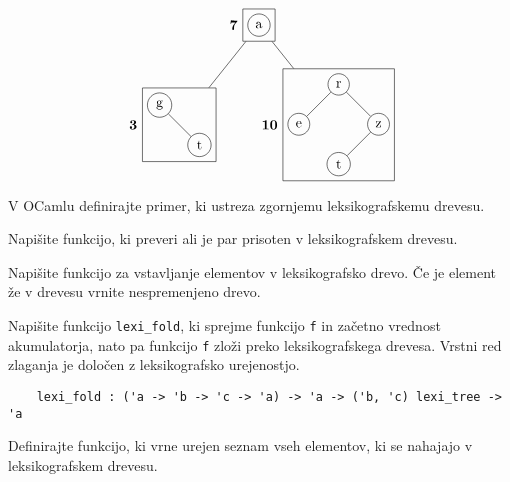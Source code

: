 \documentclass[arhiv]{../izpit}
\begin{document}
\[
  \begin{tikzpicture}[level distance=2.5cm,
    level 1/.style={sibling distance=4cm},
    level 2/.style={sibling distance=2cm}
    ]
    \node[rectangle, draw, label=left:\textbf{7}] 
        {\begin{tikzpicture}[level distance=1cm]
            \node [circle,draw] {a};
        \end{tikzpicture}}
    child {node [rectangle, draw, label=left:\textbf{3}] 
        {\begin{tikzpicture}[level distance=1cm, level 1/.style={sibling distance=1cm}]
            \node [circle,draw] {g}
                child { node [circle,draw, xshift=1cm] {t}};
        \end{tikzpicture}}
        }
    child {node [rectangle, draw, label=left:\textbf{10}] 
        {\begin{tikzpicture}[level distance=1cm, level 1/.style={sibling distance=1cm}]
            \node [circle,draw] {r}
                child { node [circle,draw] {e}}
                child { node [circle,draw] {z}
                    child {node [circle,draw, xshift=-1cm] {t}}};
        \end{tikzpicture}}
        }
    ;
  \end{tikzpicture}
\]


\podnaloga[\tocke{3}]
V OCamlu definirajte primer, ki ustreza zgornjemu leksikografskemu drevesu.

\podnaloga[\tocke{7}]
Napišite funkcijo, ki preveri ali je par prisoten v leksikografskem drevesu.

\podnaloga[\tocke{7}]
Napišite funkcijo za vstavljanje elementov v leksikografsko drevo. Če je element že v drevesu vrnite nespremenjeno drevo.

\podnaloga[\tocke{7}]
Napišite funkcijo \verb|lexi_fold|, ki sprejme funkcijo \verb|f| in začetno vrednost akumulatorja, nato pa funkcijo \verb|f| zloži preko leksikografskega drevesa. Vrstni red zlaganja je določen z leksikografsko urejenostjo.

\begin{verbatim}
    lexi_fold : ('a -> 'b -> 'c -> 'a) -> 'a -> ('b, 'c) lexi_tree -> 'a
\end{verbatim}

\podnaloga[\tocke{6}]
Definirajte funkcijo, ki vrne urejen seznam vseh elementov, ki se nahajajo v leksikografskem drevesu.


\end{document}
